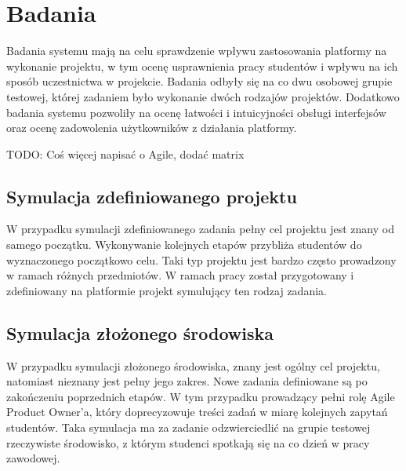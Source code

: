 \section{Badania}

Badania systemu mają na celu sprawdzenie wpływu zastosowania platformy na wykonanie projektu, w tym ocenę usprawnienia pracy studentów i wpływu na ich sposób uczestnictwa w projekcie.
Badania odbyły się na co dwu osobowej grupie testowej, której zadaniem było wykonanie dwóch rodzajów projektów.
Dodatkowo badania systemu pozwoliły na ocenę łatwości i intuicyjności obsługi interfejsów oraz ocenę zadowolenia użytkowników z działania platformy.

TODO: Coś więcej napisać o Agile, dodać matrix

\subsection{Symulacja zdefiniowanego projektu}

W przypadku symulacji zdefiniowanego zadania pełny cel projektu jest znany od samego początku.
Wykonywanie kolejnych etapów przybliża studentów do wyznaczonego początkowo celu.
Taki typ projektu jest bardzo często prowadzony w ramach różnych przedmiotów.
W ramach pracy został przygotowany i zdefiniowany na platformie projekt symulujący ten rodzaj zadania.

\subsection{Symulacja złożonego środowiska}

W przypadku symulacji złożonego środowiska, znany jest ogólny cel projektu, natomiast nieznany jest pełny jego zakres.
Nowe zadania definiowane są po zakończeniu poprzednich etapów.
W tym przypadku prowadzący pełni rolę Agile Product Owner’a, który doprecyzowuje treści zadań w miarę kolejnych zapytań studentów.
Taka symulacja ma za zadanie odzwierciedlić na grupie testowej rzeczywiste środowisko, z którym studenci spotkają się na co dzień w pracy zawodowej.




